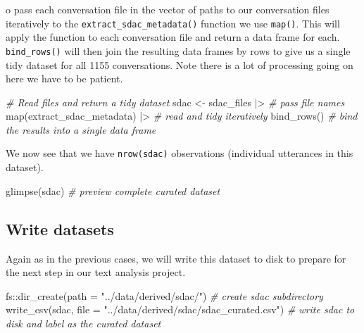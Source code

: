 \documentclass[
  letterpaper,
  DIV=11,
  numbers=noendperiod]{scrreport}
\newenvironment{Shaded}{\begin{snugshade}}{\end{snugshade}}
\newcommand{\AttributeTok}[1]{\textcolor[rgb]{0.00,0.00,0.00}{#1}}
\newcommand{\CommentTok}[1]{\textcolor[rgb]{0.00,0.00,0.00}{\textit{#1}}}
\newcommand{\FunctionTok}[1]{\textcolor[rgb]{0.00,0.00,0.00}{#1}}
\newcommand{\NormalTok}[1]{\textcolor[rgb]{0.00,0.00,0.00}{#1}}
\newcommand{\OtherTok}[1]{\textcolor[rgb]{0.00,0.00,0.00}{#1}}
\newcommand{\SpecialCharTok}[1]{\textcolor[rgb]{0.00,0.00,0.00}{#1}}
\newcommand{\StringTok}[1]{\textcolor[rgb]{0.00,0.00,0.00}{#1}}
\theoremstyle{definition}
\theoremstyle{remark}
\begin{document}
o pass each conversation file in the vector of paths to our conversation
files iteratively to the \texttt{extract\_sdac\_metadata()} function we
use \texttt{map()}. This will apply the function to each conversation
file and return a data frame for each. \texttt{bind\_rows()} will then
join the resulting data frames by rows to give us a single tidy dataset
for all 1155 conversations. Note there is a lot of processing going on
here we have to be patient.

\begin{Shaded}
\begin{Highlighting}[]
\CommentTok{\# Read files and return a tidy dataset}
\NormalTok{sdac }\OtherTok{\textless{}{-}} 
\NormalTok{  sdac\_files }\SpecialCharTok{|\textgreater{}} \CommentTok{\# pass file names}
  \FunctionTok{map}\NormalTok{(extract\_sdac\_metadata) }\SpecialCharTok{|\textgreater{}} \CommentTok{\# read and tidy iteratively }
  \FunctionTok{bind\_rows}\NormalTok{() }\CommentTok{\# bind the results into a single data frame}
\end{Highlighting}
\end{Shaded}

We now see that we have \texttt{nrow(sdac)} observations (individual
utterances in this dataset).

\begin{Shaded}
\begin{Highlighting}[]
\FunctionTok{glimpse}\NormalTok{(sdac) }\CommentTok{\# preview complete curated dataset}
\end{Highlighting}
\end{Shaded}

\hypertarget{write-datasets}{%
\subsection{Write datasets}\label{write-datasets}}

Again as in the previous cases, we will write this dataset to disk to
prepare for the next step in our text analysis project.

\begin{Shaded}
\begin{Highlighting}[]
\NormalTok{fs}\SpecialCharTok{::}\FunctionTok{dir\_create}\NormalTok{(}\AttributeTok{path =} \StringTok{"../data/derived/sdac/"}\NormalTok{) }\CommentTok{\# create sdac subdirectory}
\FunctionTok{write\_csv}\NormalTok{(sdac, }
          \AttributeTok{file =} \StringTok{"../data/derived/sdac/sdac\_curated.csv"}\NormalTok{) }\CommentTok{\# write sdac to disk and label as the curated dataset}
\end{Highlighting}
\end{Shaded}
\end{document}
